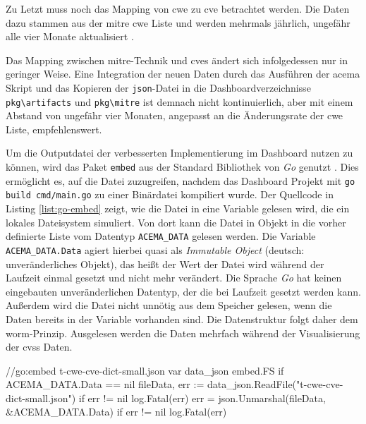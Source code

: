 Zu Letzt muss noch das Mapping von \gls{cwe} zu \gls{cve} betrachtet werden. Die Daten dazu stammen aus der \gls{mitre} \gls{cwe} Liste und werden mehrmals jährlich, ungefähr alle vier Monate aktualisiert \autocite{CWEDownloads} \autocite{AIWorkingGroupMeeting_slides20241115_CWEAIWGpdf2024}.

Das Mapping zwischen \gls{mitre}-Technik und \glspl{cve} ändert sich infolgedessen nur in geringer Weise. Eine Integration der neuen Daten durch das Ausführen der \gls{acema} Skript und das Kopieren der \verb|json|-Datei in die Dashboardverzeichnisse \verb|pkg\artifacts| und \verb|pkg\mitre| ist demnach nicht kontinuierlich, aber mit einem Abstand von ungefähr vier Monaten, angepasst an die Änderungsrate der \gls{cwe} Liste, empfehlenswert.

Um die Outputdatei der verbesserten Implementierung im Dashboard nutzen zu können, wird das Paket \verb|embed| aus der Standard Bibliothek von \textit{Go} genutzt \autocite{EmbedPackageEmbed}. Dies ermöglicht es, auf die Datei zuzugreifen, nachdem das Dashboard Projekt mit \verb|go build cmd/main.go| zu einer Binärdatei kompiliert wurde. Der Quellcode in Listing \ref{list:go-embed} zeigt, wie die Datei in eine Variable gelesen wird, die ein lokales Dateisystem simuliert. Von dort kann die Datei in Objekt in die vorher definierte Liste vom Datentyp \verb|ACEMA_DATA| gelesen werden. Die Variable \verb|ACEMA_DATA.Data| agiert hierbei quasi als \textit{Immutable Object} (deutsch: unveränderliches Objekt), das heißt der Wert der Datei wird während der Laufzeit einmal gesetzt und nicht mehr verändert. Die Sprache \textit{Go} hat keinen eingebauten unveränderlichen Datentyp, der die bei Laufzeit gesetzt werden kann. Außerdem wird die Datei nicht unnötig aus dem Speicher gelesen, wenn die Daten bereits in der Variable vorhanden sind. Die Datenstruktur folgt daher dem \gls{worm}-Prinzip. Ausgelesen werden die Daten mehrfach während der Visualisierung der \gls{cvss} Daten.

\begin{code}[caption=Datei in Binardatei einbetten und in Struktur überführen]
    //go:embed t-cwe-cve-dict-small.json
    var data_json embed.FS
    if ACEMA_DATA.Data == nil {
        fileData, err := data_json.ReadFile("t-cwe-cve-dict-small.json")
        if err != nil {
            log.Fatal(err)
        }
        err = json.Unmarshal(fileData, &ACEMA_DATA.Data)
        if err != nil {
            log.Fatal(err)
        }
    }
\end{code}
\label{list:go-embed}

